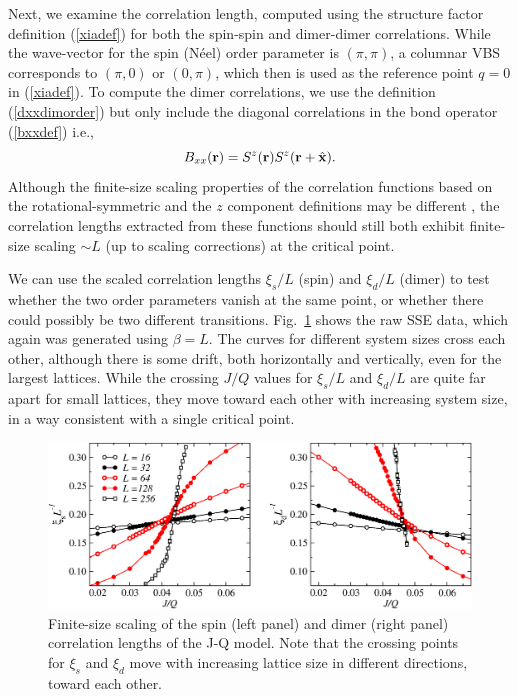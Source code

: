 \documentclass[draft,numberedheadings]{aipproc}
\begin{document}
Next, we examine the correlation length, computed using the structure factor definition (\ref{xiadef}) for both the spin-spin and dimer-dimer correlations. 
While the wave-vector for the spin (N\'eel) order parameter is $(\pi,\pi)$, a columnar VBS corresponds to $(\pi,0)$ or $(0,\pi)$, which then is used
as the reference point $q=0$ in (\ref{xiadef}). To compute the dimer correlations, we use the definition (\ref{dxxdimorder}) but only include the diagonal 
correlations in the bond operator (\ref{bxxdef}) i.e.,
\begin{equation}
B_{xx}({\bf r})=S^z({\bf r})S^z({\bf r}+\hat {\bf x}). 
\label{bxxzzdef}
\end{equation}
Although the finite-size scaling properties of the correlation functions based on the rotational-symmetric and the $z$ component definitions may be different 
\cite{melko08a}, the correlation lengths extracted from these functions should still  both exhibit finite-size scaling $\sim L$ (up to scaling corrections) at 
the critical point. 

We can use the scaled correlation lengths $\xi_s/L$ (spin) and $\xi_d/L$ (dimer) to test whether the two order parameters vanish at the same point, or whether 
there could possibly be two different transitions. Fig.~\ref{jqcorrlen} shows the raw SSE data, which again was generated using $\beta=L$. The curves for 
different system sizes cross each other, although there is some drift, both horizontally and vertically, even for the largest lattices. While the crossing 
$J/Q$ values for $\xi_s/L$ and $\xi_d/L$ are quite far apart for small lattices, they move toward each other with increasing system size, in a way 
consistent with a single critical point.

\begin{figure}
\includegraphics[width=13.5cm, clip]{jqcorrlen.eps}
\caption{Finite-size scaling of the spin (left panel) and dimer (right panel) correlation lengths of the J-Q model. Note that the crossing 
points for $\xi_s$ and $\xi_d$ move with increasing lattice size in different directions, toward each other.}
\label{jqcorrlen}
\end{figure}
\end{document}
